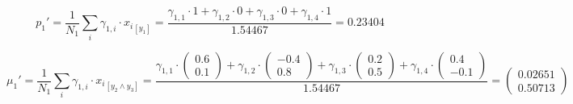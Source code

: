 \documentclass[12pt]{article}
\begin{document}
\begin{enumerate}[leftmargin=\labelsep]
          \begingroup
          \allowdisplaybreaks
          \begin{equation*}
              p_1' = \frac{1}{N_1} \sum_{i} \gamma_{1,i} \cdot {x_i}_{[y_1]}
                   = \frac{\gamma_{1,1} \cdot 1
                          + \gamma_{1,2} \cdot 0
                          + \gamma_{1,3} \cdot 0
                          + \gamma_{1,4} \cdot 1}{1.54467}
                   = 0.23404
          \end{equation*}
          \endgroup

          \begingroup
          \allowdisplaybreaks
          \begin{equation*}
              \mu_1' = \frac{1}{N_1} \sum_{i} \gamma_{1,i} \cdot {x_i}_{[y_2 \land y_3]}
                     = \frac{\gamma_{1,1} \cdot \begin{pmatrix} 0.6 \\ 0.1 \end{pmatrix}
                            + \gamma_{1,2} \cdot \begin{pmatrix} -0.4 \\ 0.8 \end{pmatrix}
                            + \gamma_{1,3} \cdot \begin{pmatrix} 0.2 \\ 0.5 \end{pmatrix}
                            + \gamma_{1,4} \cdot \begin{pmatrix} 0.4 \\ -0.1 \end{pmatrix}}{1.54467}
                     = \begin{pmatrix} 0.02651 \\ 0.50713 \end{pmatrix}
          \end{equation*}
          \endgroup


\end{enumerate}
\end{document}
